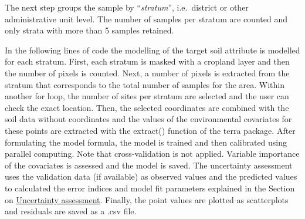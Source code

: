 \documentclass[
  10pt,
  b5paper,
  oneside]{book}
\newenvironment{Shaded}{\begin{snugshade}}{\end{snugshade}}
\newcommand{\AttributeTok}[1]{\textcolor[rgb]{0.77,0.63,0.00}{#1}}
\newcommand{\CommentTok}[1]{\textcolor[rgb]{0.56,0.35,0.01}{\textit{#1}}}
\newcommand{\ConstantTok}[1]{\textcolor[rgb]{0.00,0.00,0.00}{#1}}
\newcommand{\DecValTok}[1]{\textcolor[rgb]{0.00,0.00,0.81}{#1}}
\newcommand{\FunctionTok}[1]{\textcolor[rgb]{0.00,0.00,0.00}{#1}}
\newcommand{\NormalTok}[1]{#1}
\newcommand{\OtherTok}[1]{\textcolor[rgb]{0.56,0.35,0.01}{#1}}
\newcommand{\SpecialCharTok}[1]{\textcolor[rgb]{0.00,0.00,0.00}{#1}}
\begin{document}
The next step groups the sample by ``\emph{stratum}'', i.e.~district or other administrative unit level. The number of samples per stratum are counted and only strata with more than 5 samples retained.

\begin{Shaded}
\end{Shaded}

In the following lines of code the modelling of the target soil attribute is modelled for each stratum. First, each stratum is masked with a cropland layer and then the number of pixels is counted. Next, a number of pixels is extracted from the stratum that corresponds to the total number of samples for the area.
Within another for loop, the number of sites per stratum are selected and the user can check the exact location. Then, the selected coordinates are combined with the soil data without coordinates and the values of the environmental covariates for these points are extracted with the extract() function of the terra package.
After formulating the model formula, the model is trained and then calibrated using parallel computing. Note that cross-validation is not applied. Variable importance of the covariates is assessed and the model is saved.
The uncertainty assessment uses the validation data (if available) as observed values and the predicted values to calculated the error indices and model fit parameters explained in the Section on \protect\hyperlink{uncertainty-assessment}{Uncertainty assessment}. Finally, the point values are plotted as scatterplots and residuals are saved as a .csv file.
\end{document}
